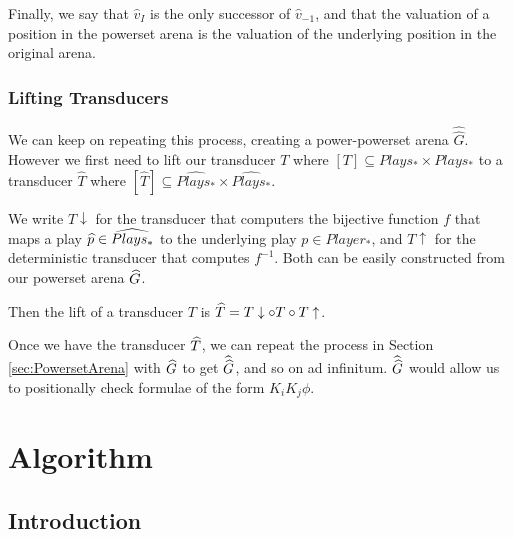 \documentclass[10pt, a4paper]{report}
\begin{document}
Finally, we say that $\widehat{v}_I$ is the only successor of
$\widehat{v}_{-1}$, and that the valuation of a position in the powerset arena
is the valuation of the underlying position in the original arena. 

\subsection{Lifting Transducers}

We can keep on repeating this process, creating a power-powerset arena
$\widehat{\widehat{G}}$. However we first need to lift our transducer $T$ where
$[T] \subseteq Plays_\ast \times Plays_\ast$ to a transducer $\widehat{T}$ where
$[\widehat{T}] \subseteq \widehat{Plays_\ast} \times \widehat{Plays_\ast}$.

We write $T\downarrow$ for the transducer that computers the bijective function
$f$ that maps a play $\widehat{p} \in \widehat{Plays_\ast}$ to the underlying play $p
\in Player_\ast$, and $T\uparrow$ for the deterministic transducer that computes
$f^{-1}$. Both can be easily constructed from our powerset arena $\widehat{G}$.

Then the lift of a transducer $T$ is $\widehat{T} = T\downarrow \circ T \circ
T\uparrow$.

Once we have the transducer $\widehat{T}$, we can repeat the process in Section
\ref{sec:PowersetArena} with $\widehat{G}$ to get $\widehat{\widehat{G}}$, and so on ad
infinitum. $\widehat{\widehat{G}}$ would allow us to positionally check formulae of the
form $K_i K_j \phi$.

\newpage

\chapter{Algorithm}

\section{Introduction}


\begin{wrapfigure}{r}{0.2\textwidth}
  \centering
  \caption{}
  \label{fig:introgossip}
\end{wrapfigure}
\end{document}
